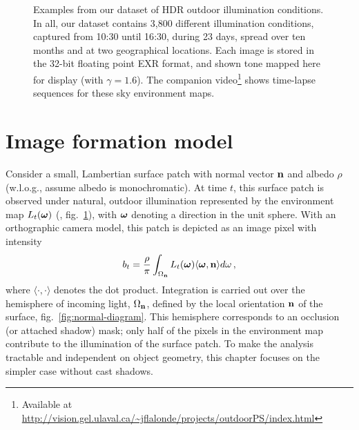 \begin{figure}
\begin{tabular}{@{}rcccccccccccc@{}}
    \\

    \end{tabular}
    \caption[HDRDB dataset excerpt]{Examples from our dataset of HDR outdoor illumination conditions. In all, our dataset contains 3,800 different illumination conditions, captured from 10{:}30 until 16{:}30, during 23 days, spread over ten months and at two geographical locations. Each image is stored in the 32-bit floating point EXR format, and shown tone mapped here for display (with $\gamma = 1.6$). The companion video\footnote{Available at \url{http://vision.gel.ulaval.ca/~jflalonde/projects/outdoorPS/index.html}} shows time-lapse sequences for these sky environment maps.}
    \label{fig:database}
\end{figure}


\section{Image formation model}
\label{iccp15:ifm}

Consider a small, Lambertian surface patch with normal vector ${\bf n}$ and albedo $\rho$ (w.l.o.g., assume albedo is monochromatic). At time $t$, this surface patch is observed under natural, outdoor illumination represented by the environment map $L_t(\boldsymbol \omega)$ (\eg, fig.~\ref{fig:database}), with $\boldsymbol \omega$ denoting a direction in the unit sphere. With an orthographic camera model, this patch is depicted as an image pixel with intensity
%
\begin{equation}
    b_t = \frac{\rho}{\pi} \int_{\Omega_{\bf n}} L_t(\mathbf{\boldsymbol \omega}) \langle \boldsymbol \omega, {\bf n} \rangle d\omega \,,
    \label{eqn:imageformation-continuous}
\end{equation}
%
where $\langle \cdot, \cdot \rangle$ denotes the dot product. Integration is carried out over the hemisphere of incoming light, $\Omega_{\bf n}$, defined by the local orientation ${\bf n}$ of the surface, fig.~\ref{fig:normal-diagram}. This hemisphere corresponds to an occlusion (or attached shadow) mask; only half of the pixels in the environment map contribute to the illumination of the surface patch. To make the analysis tractable and independent on object geometry, this chapter focuses on the simpler case without cast shadows.

